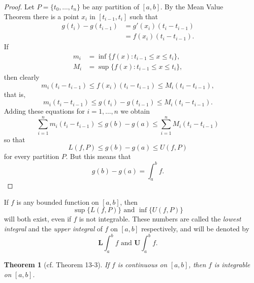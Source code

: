 \documentclass{article}
\newtheorem*{theorem*}{Theorem}
\begin{document}
\begin{proof}
  Let $P = \{t_0, \ldots, t_n\}$ be any partition of $[a, b]$. By the Mean
  Value Theorem there is a point $x_i$ in $[t_{i - 1}, t_i]$ such that
  \begin{align*}
    g(t_i) - g(t_{i - 1}) &= g'(x_i)(t_i - t_{i - 1}) \\
      &= f(x_i)(t_i - t_{i - 1}).
  \end{align*} If \begin{align*}
    m_i &= \inf\{f(x): t_{i - 1} \leq x \leq t_i\}, \\
    M_i &= \sup\{f(x): t_{i - 1} \leq x \leq t_i\},
  \end{align*} then clearly \begin{equation*}
    m_i(t_i - t_{i - 1}) \leq f(x_i)(t_i - t_{i - 1}) \leq M_i(t_i -
      t_{i - 1}),
  \end{equation*} that is, \begin{equation*}
    m_i(t_i - t_{i - 1}) \leq g(t_i) - g(t_{i - 1}) \leq M_i(t_i - t_{i - 1}).
  \end{equation*} Adding these equations for $i = 1, \ldots, n$ we obtain
  \begin{equation*}
    \sum_{i = 1}^n m_i(t_i - t_{i - 1}) \leq g(b) - g(a) \leq
      \sum_{i = 1}^n M_i(t_i - t_{i - 1})
  \end{equation*} so that \begin{equation*}
    L(f, P) \leq g(b) - g(a) \leq U(f, P)
  \end{equation*} for every partition $P$. But this means that
  \begin{equation*}
    g(b) - g(a) = \int_a^b f.
  \end{equation*}
\end{proof}

If $f$ is any bounded function on $[a, b]$, then \begin{equation*}
  \sup\{L(f, P)\} \text{ and } \inf\{U(f, P)\}
\end{equation*} will both exist, even if $f$ is not integrable. These numbers
are called the \emph{lowest integral} and the \emph{upper integral} of $f$ on
$[a, b]$ respectively, and will be denoted by \begin{equation*}
  \textbf{L}\int_a^b f \text{ and } \textbf{U}\int_a^b f.
\end{equation*}

\begin{theorem*}[cf. Theorem 13-3]
  If $f$ is continuous on $[a, b]$, then $f$ is integrable on $[a, b]$.
\end{theorem*}
\end{document}

